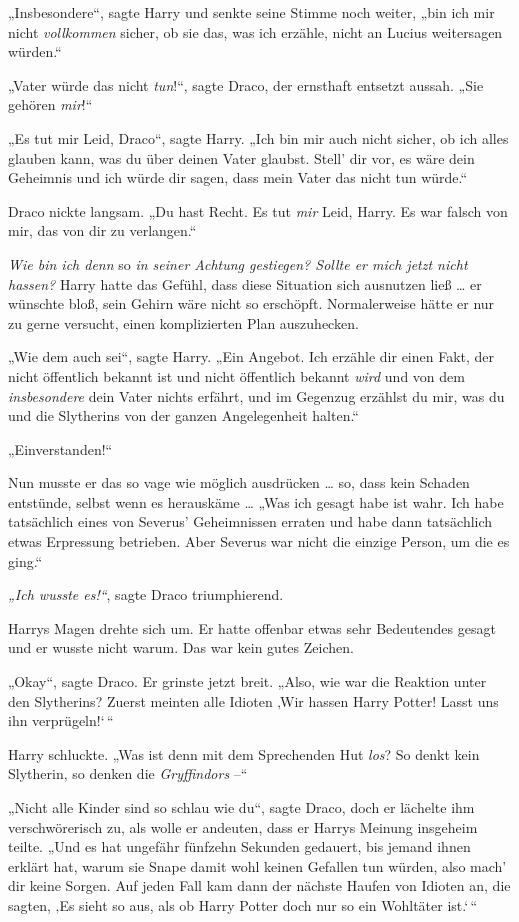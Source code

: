 {„Insbesondere“, sagte Harry und senkte seine Stimme noch weiter, „bin ich mir nicht \emph{vollkommen} sicher, ob sie das, was ich erzähle, nicht an Lucius weitersagen würden.“

„Vater würde das nicht \emph{tun}!“, sagte Draco, der ernsthaft entsetzt aussah. „Sie gehören \emph{mir}!“

„Es tut mir Leid, Draco“, sagte Harry. „Ich bin mir auch nicht sicher, ob ich alles glauben kann, was du über deinen Vater glaubst. Stell' dir vor, es wäre dein Geheimnis und ich würde dir sagen, dass mein Vater das nicht tun würde.“

Draco nickte langsam. „Du hast Recht. Es tut \emph{mir} Leid, Harry. Es war falsch von mir, das von dir zu verlangen.“

\emph{Wie bin ich denn} so \emph{in seiner Achtung gestiegen? Sollte er mich jetzt nicht hassen?} Harry hatte das Gefühl, dass diese Situation sich ausnutzen ließ … er wünschte bloß, sein Gehirn wäre nicht so erschöpft. Normalerweise hätte er nur zu gerne versucht, einen komplizierten Plan auszuhecken.

„Wie dem auch sei“, sagte Harry. „Ein Angebot. Ich erzähle dir einen Fakt, der nicht öffentlich bekannt ist und nicht öffentlich bekannt \emph{wird} und von dem \emph{insbesondere} dein Vater nichts erfährt, und im Gegenzug erzählst du mir, was du und die Slytherins von der ganzen Angelegenheit halten.“

„Einverstanden!“

Nun musste er das so vage wie möglich ausdrücken … so, dass kein Schaden entstünde, selbst wenn es herauskäme … „Was ich gesagt habe ist wahr. Ich habe tatsächlich eines von Severus' Geheimnissen erraten und habe dann tatsächlich etwas Erpressung betrieben. Aber Severus war nicht die einzige Person, um die es ging.“

\emph{„Ich wusste es!“}, sagte Draco triumphierend.

Harrys Magen drehte sich um. Er hatte offenbar etwas sehr Bedeutendes gesagt und er wusste nicht warum. Das war kein gutes Zeichen.

„Okay“, sagte Draco. Er grinste jetzt breit. „Also, wie war die Reaktion unter den Slytherins? Zuerst meinten alle Idioten ‚Wir hassen Harry Potter! Lasst uns ihn verprügeln!`\,“

Harry schluckte. „Was ist denn mit dem Sprechenden Hut \emph{los}? So denkt kein Slytherin, so denken die \emph{Gryffindors} --“

„Nicht alle Kinder sind so schlau wie du“, sagte Draco, doch er lächelte ihm verschwörerisch zu, als wolle er andeuten, dass er Harrys Meinung insgeheim teilte. „Und es hat ungefähr fünfzehn Sekunden gedauert, bis jemand ihnen erklärt hat, warum sie Snape damit wohl keinen Gefallen tun würden, also mach' dir keine Sorgen. Auf jeden Fall kam dann der nächste Haufen von Idioten an, die sagten, ‚Es sieht so aus, als ob Harry Potter doch nur so ein Wohltäter ist.`\,“

}
